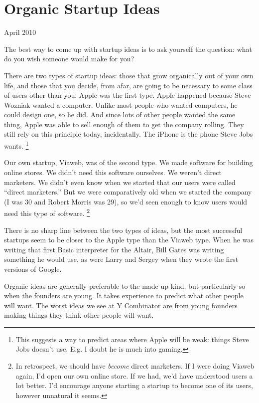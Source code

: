 \chapter{Organic Startup Ideas}

April 2010

The best way to come up with startup ideas is to ask yourself the
question: what do you wish someone would make for you?

There are two types of startup ideas: those that grow organically out of
your own life, and those that you decide, from afar, are going to be
necessary to some class of users other than you. Apple was the first
type. Apple happened because Steve Wozniak wanted a computer. Unlike
most people who wanted computers, he could design one, so he did. And
since lots of other people wanted the same thing, Apple was able to sell
enough of them to get the company rolling. They still rely on this
principle today, incidentally. The iPhone is the phone Steve Jobs wants.
\footnote{This suggests a way to predict areas where Apple will be weak:
things Steve Jobs doesn't use. E.g. I doubt he is much into gaming.}

Our own startup, Viaweb, was of the second type. We made software for
building online stores. We didn't need this software ourselves. We
weren't direct marketers. We didn't even know when we started that our
users were called ``direct marketers.'' But we were comparatively old
when we started the company (I was 30 and Robert Morris was 29), so we'd
seen enough to know users would need this type of software.
\footnote{In retrospect, we should have \emph{become} direct marketers. If
I were doing Viaweb again, I'd open our own online store. If we had,
we'd have understood users a lot better. I'd encourage anyone starting a
startup to become one of its users, however unnatural it seems.}

There is no sharp line between the two types of ideas, but the most
successful startups seem to be closer to the Apple type than the Viaweb
type. When he was writing that first Basic interpreter for the Altair,
Bill Gates was writing something he would use, as were Larry and Sergey
when they wrote the first versions of Google.

Organic ideas are generally preferable to the made up kind, but
particularly so when the founders are young. It takes experience to
predict what other people will want. The worst ideas we see at Y
Combinator are from young founders making things they think other people
will want.

